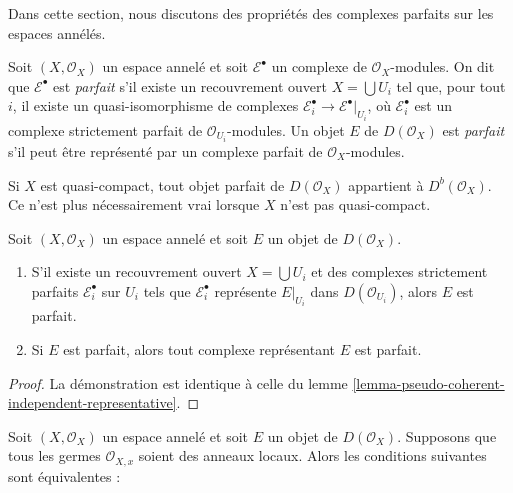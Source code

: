 {\noindent
Dans cette section, nous discutons des propriétés des complexes parfaits sur les espaces annélés.

\begin{definition}

\label{definition-perfect}
Soit $(X, \mathcal{O}_X)$ un espace annelé et soit $\mathcal{E}^\bullet$ un complexe de $\mathcal{O}_X$-modules. On dit que $\mathcal{E}^\bullet$ est {\it parfait} s'il existe un recouvrement ouvert $X = \bigcup U_i$ tel que, pour tout $i$, il existe un quasi-isomorphisme de complexes $\mathcal{E}_i^\bullet \to \mathcal{E}^\bullet|_{U_i}$, où $\mathcal{E}_i^\bullet$ est un complexe strictement parfait de $\mathcal{O}_{U_i}$-modules. Un objet $E$ de $D(\mathcal{O}_X)$ est {\it parfait} s'il peut être représenté par un complexe parfait de $\mathcal{O}_X$-modules.
\end{definition}

\noindent
Si $X$ est quasi-compact, tout objet parfait de $D(\mathcal{O}_X)$ appartient à $D^b(\mathcal{O}_X)$. Ce n'est plus nécessairement vrai lorsque $X$ n'est pas quasi-compact.

\begin{lemma}

\label{lemma-perfect-independent-representative}
Soit $(X, \mathcal{O}_X)$ un espace annelé et soit $E$ un objet de $D(\mathcal{O}_X)$.
\begin{enumerate}
\item S'il existe un recouvrement ouvert $X = \bigcup U_i$ et des complexes strictement parfaits $\mathcal{E}_i^\bullet$ sur $U_i$ tels que $\mathcal{E}_i^\bullet$ représente $E|_{U_i}$ dans $D(\mathcal{O}_{U_i})$, alors $E$ est parfait.
\item Si $E$ est parfait, alors tout complexe représentant $E$ est parfait.
\end{enumerate}

\end{lemma}

\begin{proof}
La démonstration est identique à celle du lemme \ref{lemma-pseudo-coherent-independent-representative}.
\end{proof}

\begin{lemma}

\label{lemma-perfect-on-locally-ringed}

Soit $(X, \mathcal{O}_X)$ un espace annelé et soit $E$ un objet de
$D(\mathcal{O}_X)$. Supposons que tous les germes $\mathcal{O}_{X, x}$
soient des anneaux locaux. Alors les conditions suivantes sont équivalentes :


\end{lemma}}
